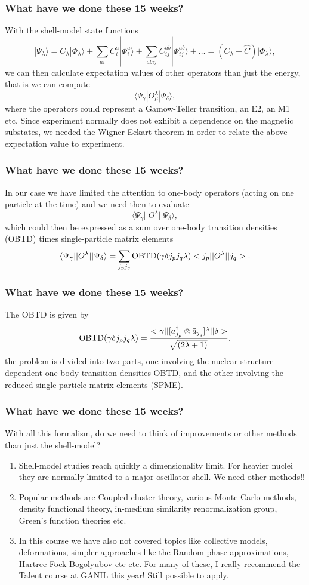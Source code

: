 \documentclass[compress]{beamer}
\begin{document}
\frame
{
  \frametitle{What have we done these 15 weeks?}
With the shell-model state functions  
\[
|\Psi_{\lambda}\rangle=C_{\lambda}|\Phi_{\lambda}\rangle+\sum_{ai}C_i^a|\Phi_i^a\rangle+\sum_{abij}C_{ij}^{ab}|\Phi_{ij}^{ab}\rangle+\dots
=(C_{\lambda}+\hat{C})|\Phi_{\lambda}\rangle,
\]
we can then calculate expectation values of other operators than just the energy, that is we can compute
\[
\langle \Psi_{\gamma} | O^{\lambda}_{\mu} | \Psi_{\delta}\rangle,  
\]
where the operators could represent a Gamow-Teller transition, an E2, an M1 etc.  
Since experiment normally does not exhibit a dependence on the magnetic substates, we needed the Wigner-Eckart theorem in order to relate
the above expectation value to experiment.
}


\frame
{
  \frametitle{What have we done these 15 weeks?}
In our case we have limited the attention to one-body operators (acting on one particle at the time) and we need then to evaluate
\[
\langle \Psi_{\gamma} || O^{\lambda} || \Psi_{\delta}\rangle,  
\]
which could then be expressed as a sum over one-body transition
densities (OBTD) times single-particle matrix elements
\[
\langle \Psi_{\gamma} || O^{\lambda} || \Psi_{\delta}\rangle=\sum _{j_{p} j_{q}} {\rm OBTD}(\gamma \delta j_{p} j_{q} \lambda )<j_p||O^{\lambda}||j_q>.
\]
}


\frame
{
  \frametitle{What have we done these 15 weeks?}
The OBTD is given by
\[
{\rm OBTD}(\gamma \delta j_{p} j_{q} \lambda )
= { <\gamma||[a^{\dagger}_{j_p}\otimes \tilde{a}_{j_q}]^{\lambda }||\delta>
\over  \sqrt{ (2\lambda +1)}\, }. 
\]
the problem is divided into two parts, one
involving the nuclear structure dependent one-body transition
densities OBTD, and the other involving the reduced
single-particle matrix
elements (SPME).
}





\frame
{
  \frametitle{What have we done these 15 weeks?}
With all this formalism, do we need to think of improvements or other methods than just the shell-model?
\begin{enumerate}
\item Shell-model studies reach quickly a dimensionality limit. For heavier nuclei they are normally limited to 
a major oscillator shell. We need other methods!!
\item Popular methods are Coupled-cluster theory, various Monte Carlo methods, density functional theory, in-medium similarity renormalization group, Green's function theories etc. 
\item In this course we have also not covered topics like collective models, deformations, simpler approaches like the Random-phase approximations, Hartree-Fock-Bogolyubov etc etc. For many of these, I really recommend the Talent course at GANIL this year! Still possible to apply.  
\end{enumerate}

}
\end{document}
